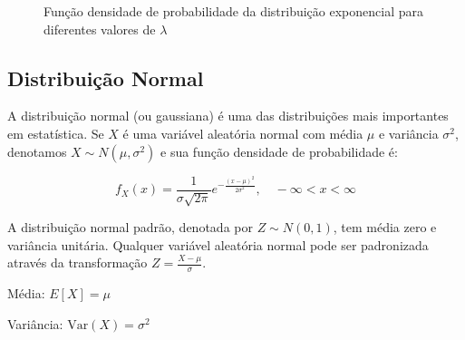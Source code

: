 \documentclass[a4paper,12pt]{article}
\begin{document}
\begin{figure}[H]
\centering
{}
\caption{Função densidade de probabilidade da distribuição exponencial para diferentes valores de $\lambda$}
\end{figure}

\subsection{Distribuição Normal}

A distribuição normal (ou gaussiana) é uma das distribuições mais importantes em estatística. Se $X$ é uma variável aleatória normal com média $\mu$ e variância $\sigma^2$, denotamos $X \sim N(\mu, \sigma^2)$ e sua função densidade de probabilidade é:

\begin{equation}
f_X(x) = \frac{1}{\sigma\sqrt{2\pi}} e^{-\frac{(x-\mu)^2}{2\sigma^2}}, \quad -\infty < x < \infty
\end{equation}

A distribuição normal padrão, denotada por $Z \sim N(0, 1)$, tem média zero e variância unitária. Qualquer variável aleatória normal pode ser padronizada através da transformação $Z = \frac{X - \mu}{\sigma}$.

Média: $E[X] = \mu$

Variância: $\text{Var}(X) = \sigma^2$
\end{document}
